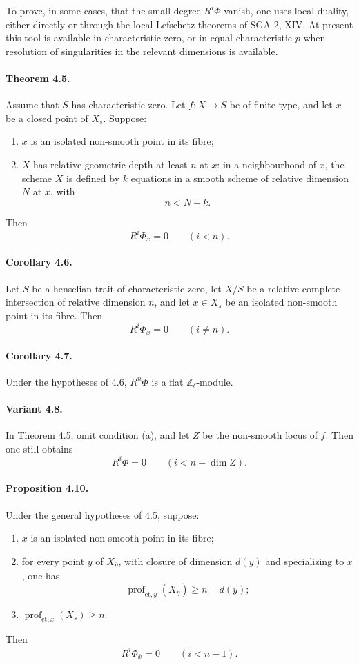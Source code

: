 \documentclass[11pt]{article}
\theoremstyle{plain}
\theoremstyle{definition}
\theoremstyle{remark}
\newcommand{\ZZ}{\mathbb Z}
\newcommand{\prof}{\operatorname{prof}}
\begin{document}
To prove, in some cases, that the small-degree $R^i\Phi$ vanish, one uses local duality, either directly or through the local Lefschetz theorems of SGA 2, XIV. At present this tool is available in characteristic zero, or in equal characteristic $p$ when resolution of singularities in the relevant dimensions is available.

\paragraph{Theorem 4.5.}
Assume that $S$ has characteristic zero. Let $f:X\to S$ be of finite type, and let $x$ be a closed point of $X_s$. Suppose:
\begin{enumerate}[label=(\alph*)]
\item $x$ is an isolated non-smooth point in its fibre;
\item $X$ has relative geometric depth at least $n$ at $x$: in a neighbourhood of $x$, the scheme $X$ is defined by $k$ equations in a smooth scheme of relative dimension $N$ at $x$, with
\[
n<N-k.
\]
\end{enumerate}
Then
\[
R^i\Phi_{\bar x}=0\qquad (i<n).
\]

\paragraph{Corollary 4.6.}
Let $S$ be a henselian trait of characteristic zero, let $X/S$ be a relative complete intersection of relative dimension $n$, and let $x\in X_s$ be an isolated non-smooth point in its fibre. Then
\[
R^i\Phi_{\bar x}=0\qquad (i\neq n).
\]

\paragraph{Corollary 4.7.}
Under the hypotheses of 4.6, $R^n\Phi$ is a flat $\ZZ_\ell$-module.

\paragraph{Variant 4.8.}
In Theorem 4.5, omit condition (a), and let $Z$ be the non-smooth locus of $f$. Then one still obtains
\[
R^i\Phi=0\qquad (i<n-\dim Z).
\]

\paragraph{Proposition 4.10.}
Under the general hypotheses of 4.5, suppose:
\begin{enumerate}[label=(\alph*)]
\item $x$ is an isolated non-smooth point in its fibre;
\item for every point $y$ of $X_{\bar\eta}$, with closure of dimension $d(y)$ and specializing to $x$, one has
\[
\prof_{\mathrm{et},y}(X_{\bar\eta})\geq n-d(y);
\]
\item $\prof_{\mathrm{et},x}(X_s)\geq n$.
\end{enumerate}
Then
\[
R^i\Phi_{\bar x}=0\qquad (i<n-1).
\]
\end{document}
